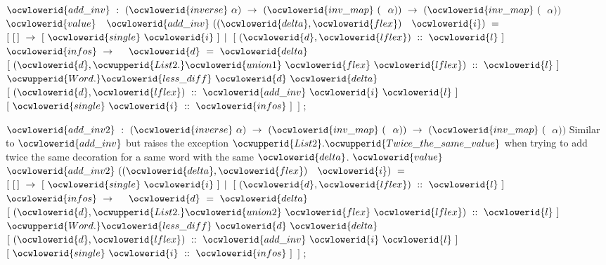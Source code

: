 \documentclass[12pt]{article}
\begin{document}
\ocwendcode{}\ocwindent{0.00em}
\ocwbegindcode{}$\ocwlowerid{add\_inv}~:~(\ocwlowerid{inverse}~\alpha{})~\rightarrow{}~(\ocwlowerid{inv\_map}~($~$\alpha{}))~\rightarrow{}~(\ocwlowerid{inv\_map}~($~$\alpha{}))$\ocwenddcode{} 
\ocweol
\label{../ML/lexmap.ml:1662}%
\medskip
\ocwbegincode{}\ocwindent{0.00em}
$\ocwlowerid{value}~$~$\ocwlowerid{add\_inv}~((\ocwlowerid{delta},\ocwlowerid{flex})~$~$\ocwlowerid{i})~=~$\ocweol
\ocwindent{1.00em}
$[~[\,]~\rightarrow{}~[~\ocwlowerid{single}~\ocwlowerid{i}~]$\ocweol
\ocwindent{1.00em}
$\mid{}~[~(\ocwlowerid{d},\ocwlowerid{lflex})~::~\ocwlowerid{l}~]~$~$\ocwlowerid{infos}~\rightarrow{}~$\ocweol
\ocwindent{3.00em}
~$\ocwlowerid{d}~=~\ocwlowerid{delta}~$~$[~(\ocwlowerid{d},\ocwupperid{List2.}\ocwlowerid{union1}~\ocwlowerid{flex}~\ocwlowerid{lflex})~::~\ocwlowerid{l}~]$\ocweol
\ocwindent{3.00em}
~~$\ocwupperid{Word.}\ocwlowerid{less\_diff}~\ocwlowerid{d}~\ocwlowerid{delta}~$~$[~(\ocwlowerid{d},\ocwlowerid{lflex})~::~\ocwlowerid{add\_inv}~\ocwlowerid{i}~\ocwlowerid{l}~]~$\ocweol
\ocwindent{18.50em}
~$[~\ocwlowerid{single}~\ocwlowerid{i}~::~\ocwlowerid{infos}~]$\ocweol
\ocwindent{1.00em}
$]$\ocweol
\ocwindent{0.00em}
;\medskip

\ocwendcode{}\ocwindent{0.00em}
\ocwbegindcode{}$\ocwlowerid{add\_inv2}~:~(\ocwlowerid{inverse}~\alpha{})~\rightarrow{}~(\ocwlowerid{inv\_map}~($~$\alpha{}))~\rightarrow{}~(\ocwlowerid{inv\_map}~($~$\alpha{}))$\ocwenddcode{} 
\ocweol
\ocwindent{0.00em}
Similar to \ocwbegindcode{}$\ocwlowerid{add\_inv}$\ocwenddcode{} but raises the exception \ocwbegindcode{}$\ocwupperid{List2}.\ocwupperid{Twice\_the\_same\_value}$\ocwenddcode{} 
   when trying to add twice the same decoration for a same word with the same \ocwbegindcode{}$\ocwlowerid{delta}$\ocwenddcode{}. 
\ocweol
\label{../ML/lexmap.ml:2220}%
\medskip
\ocwbegincode{}\ocwindent{0.00em}
$\ocwlowerid{value}~$~$\ocwlowerid{add\_inv2}~((\ocwlowerid{delta},\ocwlowerid{flex})~$~$\ocwlowerid{i})~=~$\ocweol
\ocwindent{2.00em}
$[~[\,]~\rightarrow{}~[~\ocwlowerid{single}~\ocwlowerid{i}~]$\ocweol
\ocwindent{2.00em}
$\mid{}~[~(\ocwlowerid{d},\ocwlowerid{lflex})~::~\ocwlowerid{l}~]~$~$\ocwlowerid{infos}~\rightarrow{}~$\ocweol
\ocwindent{4.00em}
~$\ocwlowerid{d}~=~\ocwlowerid{delta}~$~$[~(\ocwlowerid{d},\ocwupperid{List2.}\ocwlowerid{union2}~\ocwlowerid{flex}~\ocwlowerid{lflex})~::~\ocwlowerid{l}~]$\ocweol
\ocwindent{4.00em}
~~$\ocwupperid{Word.}\ocwlowerid{less\_diff}~\ocwlowerid{d}~\ocwlowerid{delta}~$~$[~(\ocwlowerid{d},\ocwlowerid{lflex})~::~\ocwlowerid{add\_inv}~\ocwlowerid{i}~\ocwlowerid{l}~]~$\ocweol
\ocwindent{4.00em}
~$[~\ocwlowerid{single}~\ocwlowerid{i}~::~\ocwlowerid{infos}~]$\ocweol
\ocwindent{2.00em}
$]$\ocweol
\ocwindent{0.00em}
;\medskip
\end{document}
